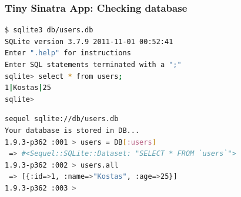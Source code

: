 \documentclass{beamer}
\begin{document}
\begin{frame}[fragile]\frametitle{Tiny Sinatra App: Checking database}

  \begin{lstlisting}[language=bash, escapechar={^}]
$ sqlite3 db/users.db 
SQLite version 3.7.9 2011-11-01 00:52:41
Enter ".help" for instructions
Enter SQL statements terminated with a ";"
sqlite> select * from users;
1|Kostas|25
sqlite>
  \end{lstlisting}

  \begin{lstlisting}[language=bash, escapechar={^}]
sequel sqlite://db/users.db
Your database is stored in DB...
1.9.3-p362 :001 > users = DB[:users]
 => #<Sequel::SQLite::Dataset: "SELECT * FROM `users`"> 
1.9.3-p362 :002 > users.all
 => [{:id=>1, :name=>"Kostas", :age=>25}] 
1.9.3-p362 :003 >
  \end{lstlisting}
  
\end{frame}
\end{document}
